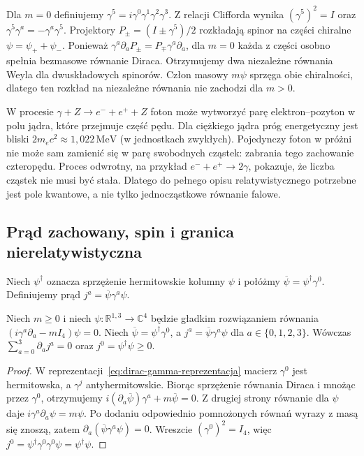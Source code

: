 \begin{uwaga}
Dla $m=0$ definiujemy $\gamma^5=i\gamma^0\gamma^1\gamma^2\gamma^3$.
Z relacji Clifforda wynika $(\gamma^5)^2=I$
oraz $\gamma^5\gamma^a=-\gamma^a\gamma^5$.
Projektory $P_\pm=(I\pm\gamma^5)/2$ rozkładają
spinor na części chiralne $\psi=\psi_++\psi_-$.
Ponieważ $\gamma^a\partial_a P_\pm
=P_\mp\gamma^a\partial_a$, dla $m=0$
każda z części osobno spełnia bezmasowe równanie Diraca.
Otrzymujemy dwa niezależne równania Weyla
dla dwuskładowych spinorów. Człon masowy
$m\psi$ sprzęga obie chiralności, dlatego ten
rozkład na niezależne równania nie zachodzi dla $m>0$.
\end{uwaga}

\begin{przyklad}
W procesie $\gamma+Z\to e^-+e^++Z$ foton może
wytworzyć parę elektron--pozyton w polu jądra,
które przejmuje część pędu. Dla ciężkiego jądra
próg energetyczny jest bliski $2m_ec^2\approx
1{,}022\,\mathrm{MeV}$ (w jednostkach zwykłych).
Pojedynczy foton w próżni nie może sam zamienić się
w parę swobodnych cząstek: zabrania tego zachowanie
czteropędu. Proces odwrotny, na przykład
$e^-+e^+\to2\gamma$, pokazuje, że liczba cząstek
nie musi być stała. Dlatego do pełnego opisu
relatywistycznego potrzebne jest pole kwantowe,
a nie tylko jednocząstkowe równanie falowe.
\end{przyklad}

\subsection{Prąd zachowany, spin i granica nierelatywistyczna}

Niech $\psi^\dagger$ oznacza sprzężenie hermitowskie
kolumny $\psi$ i połóżmy
$\overline\psi=\psi^\dagger\gamma^0$.
Definiujemy prąd $j^a=\overline\psi\gamma^a\psi$.

\begin{stwierdzenie}
\label{prop:dirac-prad}
Niech $m\geq0$ i niech
$\psi:\mathbb R^{1,3}\to\mathbb C^4$ będzie
gładkim rozwiązaniem równania
$(i\gamma^a\partial_a-mI_4)\psi=0$.
Niech $\overline\psi=\psi^\dagger\gamma^0$, a
$j^a=\overline\psi\gamma^a\psi$ dla
$a\in\{0,1,2,3\}$. Wówczas
$\sum_{a=0}^3\partial_a j^a=0$ oraz
$j^0=\psi^\dagger\psi\geq0$.
\end{stwierdzenie}
\begin{proof}
W reprezentacji~\eqref{eq:dirac-gamma-reprezentacja}
macierz $\gamma^0$ jest hermitowska, a
$\gamma^j$ antyhermitowskie. Biorąc sprzężenie
równania Diraca i mnożąc przez $\gamma^0$, otrzymujemy
$i(\partial_a\overline\psi)\gamma^a+m\overline\psi=0$.
Z drugiej strony równanie dla $\psi$ daje
$i\gamma^a\partial_a\psi=m\psi$.
Po dodaniu odpowiednio pomnożonych równań
wyrazy z masą się znoszą, zatem
$\partial_a(\overline\psi\gamma^a\psi)=0$.
Wreszcie $(\gamma^0)^2=I_4$, więc
$j^0=\psi^\dagger\gamma^0\gamma^0\psi=\psi^\dagger\psi$.
\end{proof}

